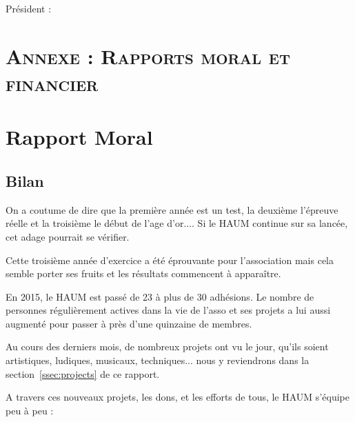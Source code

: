 \documentclass[a4paper, 11pt]{article}
\begin{document}
Président :



\newpage

\section*{\textsc{Annexe : Rapports moral et financier}} 
\section{Rapport Moral}


\subsection{Bilan}

On a coutume de dire que la première année est un test, la deuxième l'épreuve réelle et la troisième le début de l'age
d'or.... Si le HAUM continue sur sa lancée, cet adage pourrait se vérifier.

Cette troisième année d'exercice a été éprouvante pour l'association mais cela semble porter ses fruits et les résultats
commencent à apparaître.

En 2015, le HAUM est passé de 23 à plus de 30 adhésions. Le nombre de personnes régulièrement actives dans la vie de l'asso
et ses projets a lui aussi augmenté pour passer à près d'une quinzaine de membres.

Au cours des derniers mois, de nombreux projets ont vu le jour, qu'ils soient artistiques, ludiques, musicaux,
techniques... nous y reviendrons dans la section~\ref{ssec:projects} de ce rapport.

A travers ces nouveaux projets, les dons, et les efforts de tous, le HAUM s'équipe peu à peu :
\end{document}
